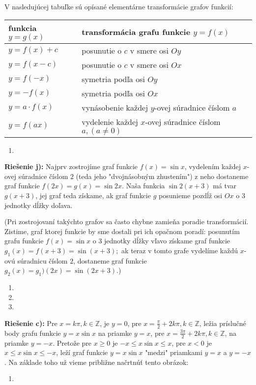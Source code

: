 V nasledujúcej tabuľke sú opísané elementárne transformácie grafov funkcií:

\begin{tabular}{|l|p{10cm}|}
  \hline
  {\bf funkcia $y=g(x)$} & {\bf transformácia grafu funkcie $y=f(x)$}  \\
  \hline \hline
  $y=f(x)+c$  & posunutie o $c$ v smere osi $Oy$ \\
  $y=f(x-c)$  & posunutie o $c$ v smere osi $Ox$ \\
  $y=f(-x)$  & symetria podľa osi $Oy$ \\
  $y=-f(x)$  & symetria podľa osi $Ox$ \\
  $y=a\cdot f(x)$  & vynásobenie každej $y$-ovej súradnice číslom $a$ \\
  $y=f(ax)$  & vydelenie každej $x$-ovej súradnice číslom $a,(a\neq 0)$ \\
  \hline
\end{tabular}

\begin{enumerate}[resume]
  \item {}
\end{enumerate}

\textbf{Riešenie j):} Najprv zostrojíme graf funkcie $f(x)=\sin x$, vydelením každej $x$-ovej súradnice číslom $2$ (teda jeho "dvojnásobným zhustením") z neho dostaneme graf funkcie $f(2x)=g(x)=\sin 2x$. Naša funkcia $\sin 2(x+3)$ má tvar $g(x+3)$, jej graf teda získame, ak graf funkcie $g$ posunieme pozdĺž osi $Ox$ o $3$ jednotky dĺžky doľava.

(Pri zostrojovaní takýchto grafov sa často chybne zamieňa poradie transformácií. Zistime, graf ktorej funkcie by sme dostali pri ich opačnom poradí: posunutím grafu funkcie $f(x)=\sin x$ o $3$ jednotky dĺžky vľavo získame graf funkcie $g_1(x)=f(x+3)=\sin (x+3);$ ak teraz v tomto grafe vydelíme každú $x$-ovú súradnicu číslom $2$, dostaneme graf funkcie $g_2(x)=g_1)(2x)=\sin (2x+3)$.)

\begin{enumerate}[resume]
  \item {}
  \item {}
  \item {}
\end{enumerate}

\textbf{Riešenie c):} Pre $x=k\pi,k\in\mathbb{Z}$, je $y=0$, pre $x=\frac{\pi}{2}+2k\pi,k\in\mathbb{Z}$, ležia príslučné body grafu funkcie $y=x\sin x$ na priamke $y=x$, pre $x=\frac{3\pi}{2}+2k\pi,k\in\mathbb{Z}$, na priamke $y=-x$. Pretože pre $x\geq 0$ je $-x\leq x\sin x\leq x$, pre $x<0$ je $x\leq x\sin x\leq -x$, leží graf funkcie $y=x\sin x$ "medzi" priamkami $y=x$ a $y=-x$. Na základe toho už vieme približne načrtnúť tento obrázok:


\begin{enumerate}[resume]
  \item {}
\end{enumerate}
